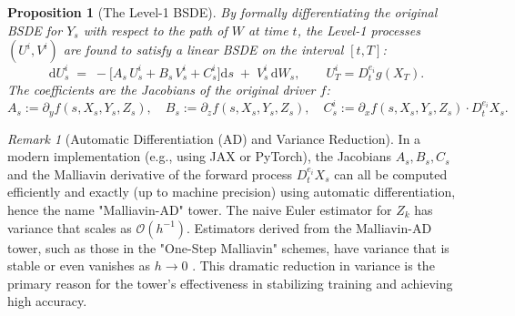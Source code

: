 \documentclass[11pt,letterpaper,oneside]{article}
\theoremstyle{plain}
\newtheorem{proposition}[theorem]{Proposition}
\theoremstyle{definition}
\theoremstyle{remark}
\newtheorem{remark}{Remark}[section]
\begin{document}
\begin{proposition}[The Level-1 BSDE]
\label{prop:level1_bsde}
By formally differentiating the original BSDE for \(Y_s\) with respect to the path of \(W\) at time \(t\), the Level-1 processes \((U^i, V^i)\) are found to satisfy a linear BSDE on the interval \([t,T]\):
\begin{equation}\label{eq:U_BSDE_main}
  \mathrm{d} U^{i}_s
  \;=\;
   -\bigl[A_s\,U^{i}_s + B_s\,V^{i}_s + C^{i}_s \bigr]\mathrm{d} s
   \;+\;
   V^{i}_s\,\mathrm{d} W_s,
  \qquad
  U^{i}_T = D_t^{e_i}g(X_T).
\end{equation}
The coefficients are the Jacobians of the original driver \(f\):
\[
  A_s := \partial_y f(s,X_s,Y_s,Z_s), \quad
  B_s := \partial_z f(s,X_s,Y_s,Z_s), \quad
  C^{i}_s := \partial_x f(s,X_s,Y_s,Z_s) \cdot D_t^{e_i}X_s.
\]
\end{proposition}

\begin{remark}[Automatic Differentiation (AD) and Variance Reduction]
In a modern implementation (e.g., using JAX or PyTorch), the Jacobians \(A_s, B_s, C_s\) and the Malliavin derivative of the forward process \(D_t^{e_i}X_s\) can all be computed efficiently and exactly (up to machine precision) using automatic differentiation, hence the name "Malliavin-AD" tower. The naive Euler estimator for \(Z_k\) has variance that scales as \(\mathcal{O}(h^{-1})\). Estimators derived from the Malliavin-AD tower, such as those in the "One-Step Malliavin" schemes, have variance that is stable or even vanishes as \(h \to 0\) \cite{DomelevoWarin2023}. This dramatic reduction in variance is the primary reason for the tower's effectiveness in stabilizing training and achieving high accuracy.
\end{remark}
\end{document}
